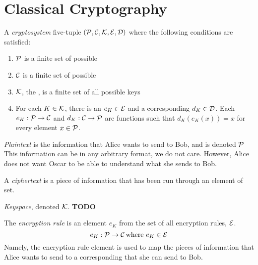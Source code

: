 \section{Classical Cryptography}\label{sec:Classical_Cryptography}
\begin{definition}[Cryptosystem]\label{def:Cryptosystem}
  A \emph{cryptosystem} five-tuple $(\operatorname{\mathcal{P}}, \operatorname{\mathcal{C}}, \operatorname{\mathcal{K}}, \operatorname{\mathcal{E}}, \operatorname{\mathcal{D}})$ where the following conditions are satisfied:
  \begin{enumerate}[noitemsep]
  \item $\operatorname{\mathcal{P}}$ is a finite set of possible \emph{}
  \item $\operatorname{\mathcal{C}}$ is a finite set of possible \emph{}
  \item $\operatorname{\mathcal{K}}$, the \emph{}, is a finite set of all possible keys
  \item For each $K \in \operatorname{\mathcal{K}}$, there is an \emph{} $e_{K}\in \operatorname{\mathcal{E}}$ and a corresponding \emph{} $d_{K} \in \operatorname{\mathcal{D}}$.
    Each $e_{K} : \operatorname{\mathcal{P}} \rightarrow \operatorname{\mathcal{C}}$ and $d_{K} : \operatorname{\mathcal{C}} \rightarrow \operatorname{\mathcal{P}}$ are functions such that $d_{K} \left( e_{K}(x) \right) = x$ for every  element $x \in \operatorname{\mathcal{P}}$.
  \end{enumerate}
\end{definition}

\begin{definition}[Plaintext]\label{def:Plaintext}
  \emph{Plaintext} is the information that Alice wants to send to Bob, and is denoted $\operatorname{\mathcal{P}}$
  This information can be in any arbitrary format, we do not care.
  However, Alice does not want Oscar to be able to understand what she sends to Bob.
\end{definition}

\begin{definition}[Ciphertext]\label{def:Ciphertext}
  A \emph{ciphertext} is a piece of  information that has been run through an element of  set.
\end{definition}

\begin{definition}[Keyspace]\label{def:Keyspace}
  \emph{Keyspace}, denoted $\operatorname{\mathcal{K}}$.
  \textbf{TODO}
\end{definition}

\begin{definition}\label{def:Encryption_Rule}
  The \emph{encryption rule} is an element $e_{K}$ from the set of all encryption rules, $\operatorname{\mathcal{E}}$.
  \begin{equation}\label{eq:Encryption_Rule}
    e_{K} : \operatorname{\mathcal{P}} \rightarrow \operatorname{\mathcal{C}} \text{where } e_{K} \in \operatorname{\mathcal{E}}
  \end{equation}
  Namely, the encryption rule element is used to map the  pieces of information that Alice wants to send to a corresponding  that she can send to Bob.
\end{definition}

